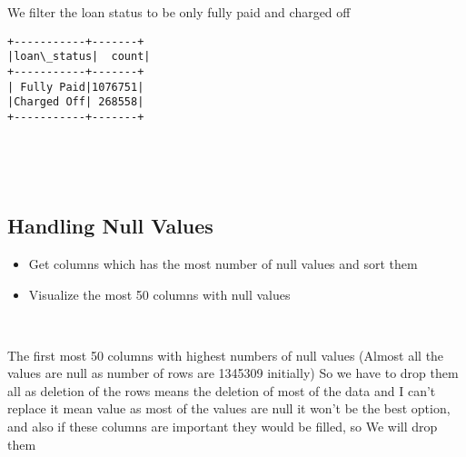 \documentclass[11pt]{article}
\providecommand{\tightlist}{%
      \setlength{\itemsep}{0pt}\setlength{\parskip}{0pt}}
\begin{document}
    We filter the loan status to be only fully paid and charged off

    \begin{Verbatim}[commandchars=\\\{\}]
+-----------+-------+
|loan\_status|  count|
+-----------+-------+
| Fully Paid|1076751|
|Charged Off| 268558|
+-----------+-------+

    \end{Verbatim}

    \begin{center}
    \end{center}
    { \hspace*{\fill} \\}
    
    \begin{center}
    \end{center}
    { \hspace*{\fill} \\}
    
    \hypertarget{handling-null-values}{%
\subsection{Handling Null Values}\label{handling-null-values}}

\begin{itemize}
\tightlist
\item
  Get columns which has the most number of null values and sort them
\end{itemize}

    \begin{itemize}
\tightlist
\item
  Visualize the most 50 columns with null values
\end{itemize}

    \begin{center}
    \end{center}
    { \hspace*{\fill} \\}
    
    The first most 50 columns with highest numbers of null values (Almost
all the values are null as number of rows are 1345309 initially) So we
have to drop them all as deletion of the rows means the deletion of most
of the data and I can't replace it mean value as most of the values are
null it won't be the best option, and also if these columns are
important they would be filled, so We will drop them
\end{document}
